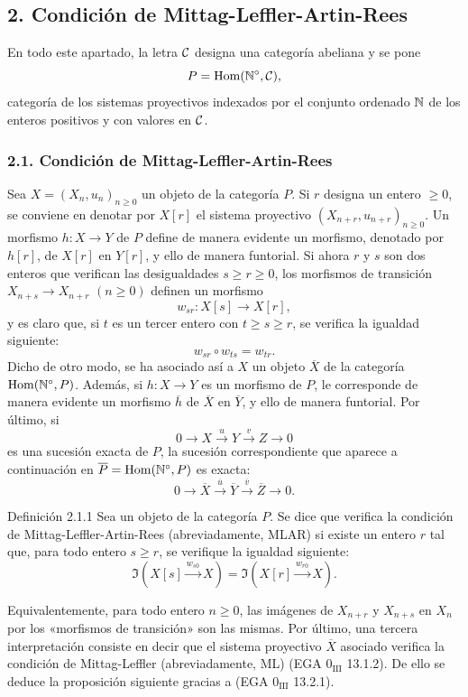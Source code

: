 \subsection*{2. Condición de Mittag-Leffler-Artin-Rees}
En todo este apartado, la letra $\mathcal C$ designa una categoría abeliana y se pone
\[
P=\operatorname{Hom}(\mathbb N^\circ,\mathcal C),
\]
categoría de los sistemas proyectivos indexados por el conjunto ordenado $\mathbb N$ de los enteros positivos y con valores en $\mathcal C$.

\subsubsection*{2.1. Condición de Mittag-Leffler-Artin-Rees}
Sea $X=(X_n,u_n)_{n\ge0}$ un objeto de la categoría $P$. Si $r$ designa un entero $\ge0$, se conviene en denotar por $X[r]$ el sistema proyectivo $(X_{n+r},u_{n+r})_{n\ge0}$. Un morfismo $h:X\to Y$ de $P$ define de manera evidente un morfismo, denotado por $h[r]$, de $X[r]$ en $Y[r]$, y ello de manera funtorial. Si ahora $r$ y $s$ son dos enteros que verifican las desigualdades $s\ge r\ge0$, los morfismos de transición $X_{n+s}\to X_{n+r}$ $(n\ge0)$ definen un morfismo
\[
w_{sr}:X[s]\longrightarrow X[r],
\]
y es claro que, si $t$ es un tercer entero con $t\ge s\ge r$, se verifica la igualdad siguiente:
\[
w_{sr}\circ w_{ts}=w_{tr}.
\]
Dicho de otro modo, se ha asociado así a $X$ un objeto $\overline X$ de la categoría $\operatorname{Hom}(\mathbb N^\circ,P)$. Además, si $h:X\to Y$ es un morfismo de $P$, le corresponde de manera evidente un morfismo $\overline h$ de $\overline X$ en $\overline Y$, y ello de manera funtorial. Por último, si
\[
0\longrightarrow X\stackrel{u}{\longrightarrow}Y\stackrel{v}{\longrightarrow}Z\longrightarrow0
\]
es una sucesión exacta de $P$, la sucesión correspondiente que aparece a continuación en $\overline P=\operatorname{Hom}(\mathbb N^\circ,P)$ es exacta:
\[
0\longrightarrow\overline X\stackrel{\overline u}{\longrightarrow}\overline Y\stackrel{\overline v}{\longrightarrow}\overline Z\longrightarrow0.
\]

\begin{statement}{Definición 2.1.1}
Sea un objeto de la categoría $P$. Se dice que verifica la condición de Mittag-Leffler-Artin-Rees (abreviadamente, MLAR) si existe un entero $r$ tal que, para todo entero $s\ge r$, se verifique la igualdad siguiente:
\[
\Im(X[s]\xrightarrow{w_{s0}}X)=\Im(X[r]\xrightarrow{w_{r0}}X).
\]
\end{statement}
Equivalentemente, para todo entero $n\ge0$, las imágenes de $X_{n+r}$ y $X_{n+s}$ en $X_n$ por los «morfismos de transición» son las mismas. Por último, una tercera interpretación consiste en decir que el sistema proyectivo $\overline X$ asociado verifica la condición de Mittag-Leffler (abreviadamente, ML) (EGA $0_{\mathrm{III}}$ 13.1.2). De ello se deduce la proposición siguiente gracias a (EGA $0_{\mathrm{III}}$ 13.2.1).

